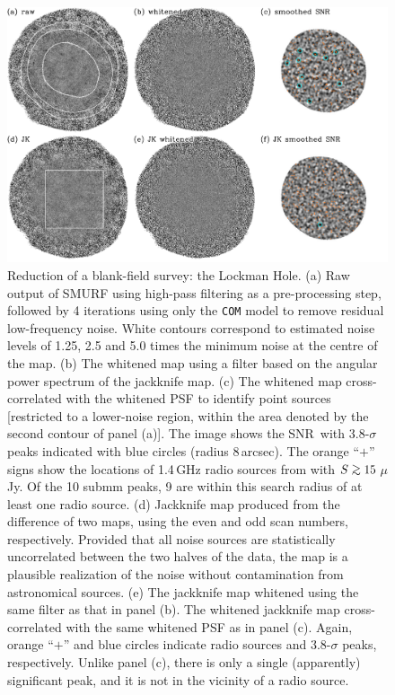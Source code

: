 \documentclass[useAMS,usenatbib,nofootinbib]{mn2e}
\newcommand{\snr}{SNR}
\def\gsim{\mathrel{\lower2.5pt\vbox{\lineskip=0pt\baselineskip=0pt
          \hbox{$>$}\hbox{$\sim$}}}}
\newcommand{\model}[1]{\texttt{#1}}
\begin{document}
\begin{figure}
\centering
\includegraphics[width=\linewidth]{lockman_maps.pdf}
\caption{Reduction of a blank-field survey: the Lockman Hole. (a) Raw
  output of SMURF using high-pass filtering as a pre-processing step,
  followed by 4 iterations using only the \model{COM} model to remove
  residual low-frequency noise. White contours correspond to estimated
  noise levels of 1.25, 2.5 and 5.0 times the minimum noise at the
  centre of the map. (b) The whitened map using a filter based on the
  angular power spectrum of the jackknife map. (c) The whitened map
  cross-correlated with the whitened PSF to identify point sources
  [restricted to a lower-noise region, within the area denoted by the
  second contour of panel (a)]. The image shows the \snr\, with
  3.8-$\sigma$ peaks indicated with blue circles (radius
  8\,arcsec). The orange ``$+$'' signs show the locations of 1.4\,GHz
  radio sources from \citet{owen2008} with $S\gsim15$\,$\mu$Jy. Of the
  10 submm peaks, 9 are within this search radius of at least one
  radio source. (d) Jackknife map produced from the difference of two
  maps, using the even and odd scan numbers, respectively. Provided
  that all noise sources are statistically uncorrelated between the
  two halves of the data, the map is a plausible realization of the
  noise without contamination from astronomical sources. (e) The
  jackknife map whitened using the same filter as that in panel
  (b). The whitened jackknife map cross-correlated with the same
  whitened PSF as in panel (c). Again, orange ``$+$'' and blue circles
  indicate radio sources and 3.8-$\sigma$ peaks, respectively. Unlike
  panel (c), there is only a single (apparently) significant peak, and
  it is not in the vicinity of a radio source.}
\label{fig:lockman_maps}
\end{figure}
\end{document}
